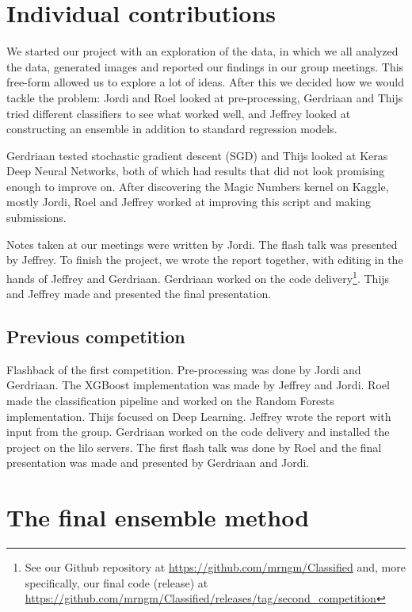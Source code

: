 \documentclass[a4paper,11pt,twocolumn]{article}
\begin{document}
\newpage

\onecolumn
\section{Individual contributions}
We started our project with an exploration of the data, in which we all
analyzed the data, generated images and reported our findings in our group
meetings. This free-form allowed us to explore a lot of ideas. After this we
decided how we would tackle the problem: Jordi and Roel looked at
pre-processing, Gerdriaan and Thijs tried different classifiers to see what
worked well, and Jeffrey looked at constructing an ensemble in addition to
standard regression models.

Gerdriaan tested stochastic gradient descent (SGD) and Thijs looked at Keras
Deep Neural Networks, both of which had results that did not look promising
enough to improve on. After discovering the Magic Numbers kernel on Kaggle,
mostly Jordi, Roel and Jeffrey worked at improving this script and making
submissions.

Notes taken at our meetings were written by Jordi. The flash talk was presented
by Jeffrey. To finish the project, we wrote the report together, with editing in
the hands of Jeffrey and Gerdriaan. Gerdriaan worked on the code
delivery\footnote{See our Github repository at
\url{https://github.com/mrngm/Classified} and, more specifically, our final code
(release) at
\url{https://github.com/mrngm/Classified/releases/tag/second\_competition}}.
Thijs and Jeffrey made and presented the final presentation.

\subsection*{Previous competition}
Flashback of the first competition. Pre-processing was done by Jordi and Gerdriaan. The XGBoost implementation was made by Jeffrey and Jordi. Roel made the classification pipeline and worked on the Random Forests implementation. Thijs focused on Deep Learning. Jeffrey wrote the report with input from the group. Gerdriaan worked on the code delivery and installed the project on the lilo servers. The first flash talk was done by Roel and the final presentation was made and presented by Gerdriaan and Jordi.

\clearpage

\appendix
\section{The final ensemble method}
\label{app:final}
\end{document}
